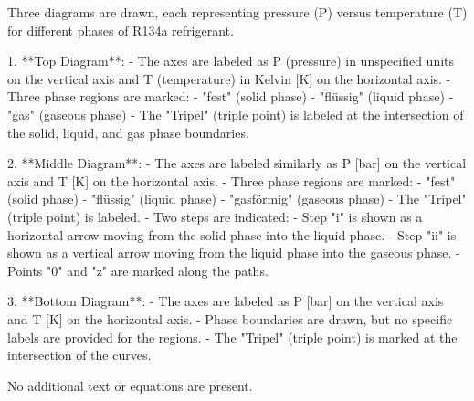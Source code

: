 Three diagrams are drawn, each representing pressure (P) versus temperature (T) for different phases of R134a refrigerant.  

1. **Top Diagram**:  
   - The axes are labeled as P (pressure) in unspecified units on the vertical axis and T (temperature) in Kelvin [K] on the horizontal axis.  
   - Three phase regions are marked:  
     - "fest" (solid phase)  
     - "flüssig" (liquid phase)  
     - "gas" (gaseous phase)  
   - The "Tripel" (triple point) is labeled at the intersection of the solid, liquid, and gas phase boundaries.  

2. **Middle Diagram**:  
   - The axes are labeled similarly as P [bar] on the vertical axis and T [K] on the horizontal axis.  
   - Three phase regions are marked:  
     - "fest" (solid phase)  
     - "flüssig" (liquid phase)  
     - "gasförmig" (gaseous phase)  
   - The "Tripel" (triple point) is labeled.  
   - Two steps are indicated:  
     - Step "i" is shown as a horizontal arrow moving from the solid phase into the liquid phase.  
     - Step "ii" is shown as a vertical arrow moving from the liquid phase into the gaseous phase.  
   - Points "0" and "z" are marked along the paths.  

3. **Bottom Diagram**:  
   - The axes are labeled as P [bar] on the vertical axis and T [K] on the horizontal axis.  
   - Phase boundaries are drawn, but no specific labels are provided for the regions.  
   - The "Tripel" (triple point) is marked at the intersection of the curves.  

No additional text or equations are present.